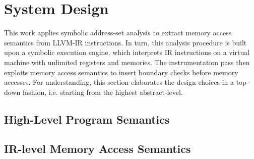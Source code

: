 \section{System Design}

\renewcommand\yphn[1]{\stepcounter{dsgn} \textcolor{blue} {\thedsgn.} \yphl{#1}}

This work applies symbolic address-set analysis to extract memory access semantics from LLVM-IR instructions.
In turn, this analysis procedure is built upon a symbolic execution engine,
which interprets IR instructions on a virtual machine with unlimited registers and memories.
The instrumentation pass then exploits memory access semantics to insert boundary checks before memory accesses.
For understanding, this section elaborates the design choices in a top-down fashion, i.e. starting from the highest abstract-level.

\subsection{High-Level Program Semantics}


\subsection{IR-level Memory Access Semantics}






